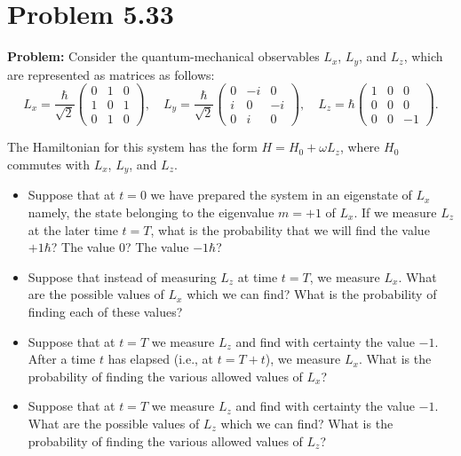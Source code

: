 \documentclass[12pt]{article}
\begin{document}
\section*{Problem 5.33}

\textbf{Problem:} Consider the quantum-mechanical observables $L_x$, $L_y$, and $L_z$, which are represented as matrices as follows:
\[
L_x = \frac{\hbar}{\sqrt{2}}\begin{pmatrix} 0 & 1 & 0 \\ 1 & 0 & 1 \\ 0 & 1 & 0 \end{pmatrix}, \quad
L_y = \frac{\hbar}{\sqrt{2}}\begin{pmatrix} 0 & -i & 0 \\ i & 0 & -i \\ 0 & i & 0 \end{pmatrix}, \quad
L_z = \hbar\begin{pmatrix} 1 & 0 & 0 \\ 0 & 0 & 0 \\ 0 & 0 & -1 \end{pmatrix}.
\]

The Hamiltonian for this system has the form $H = H_0 + \omega L_z$, where $H_0$ commutes with $L_x$, $L_y$, and $L_z$.

\begin{itemize}
\item[(a)] Suppose that at $t = 0$ we have prepared the system in an eigenstate of $L_x$ namely, the state belonging to the eigenvalue $m = +1$ of $L_x$. If we measure $L_z$ at the later time $t = T$, what is the probability that we will find the value $+1\hbar$? The value $0$? The value $-1\hbar$?

\item[(b)] Suppose that instead of measuring $L_z$ at time $t = T$, we measure $L_x$. What are the possible values of $L_x$ which we can find? What is the probability of finding each of these values?

\item[(c)] Suppose that at $t = T$ we measure $L_z$ and find with certainty the value $-1$. After a time $t$ has elapsed (i.e., at $t = T+t$), we measure $L_x$. What is the probability of finding the various allowed values of $L_x$?

\item[(d)] Suppose that at $t = T$ we measure $L_z$ and find with certainty the value $-1$. What are the possible values of $L_z$ which we can find? What is the probability of finding the various allowed values of $L_z$?
\end{itemize}
\end{document}
